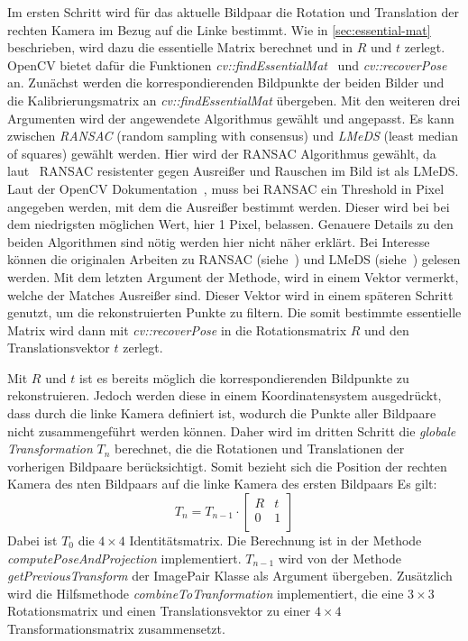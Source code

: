 Im ersten Schritt wird für das aktuelle Bildpaar die Rotation und Translation der rechten Kamera im Bezug auf die Linke bestimmt.
Wie in \cref{sec:essential-mat} beschrieben, wird dazu die essentielle Matrix berechnet und in $R$ und $t$ zerlegt.
OpenCV bietet dafür die Funktionen \emph{cv::findEssentialMat}~\cite{opencv_doc_essential_matrix} und \emph{cv::recoverPose}~\cite{opencv_doc_recover_pose} an.
Zunächst werden die korrespondierenden Bildpunkte der beiden Bilder und die Kalibrierungsmatrix an \emph{cv::findEssentialMat} übergeben.
Mit den weiteren drei Argumenten wird der angewendete Algorithmus gewählt und angepasst.
Es kann zwischen \emph{RANSAC} (random sampling with consensus) und \emph{LMeDS} (least median of squares) gewählt werden.
Hier wird der RANSAC Algorithmus gewählt, da laut~\cite[Kapitel 18, 664]{kaehler_2016} RANSAC resistenter gegen Ausreißer und Rauschen im Bild ist als LMeDS. %
Laut der OpenCV Dokumentation~\cite{opencv_doc_essential_matrix}, muss bei RANSAC ein Threshold in Pixel angegeben werden, mit dem die Ausreißer bestimmt werden.
Dieser wird bei bei dem niedrigsten möglichen Wert, hier 1 Pixel, belassen.
Genauere Details zu den beiden Algorithmen sind nötig werden hier nicht näher erklärt.
Bei Interesse können die originalen Arbeiten zu RANSAC (siehe~\cite{fischler_81}) und LMeDS (siehe~\cite{inui_03}) gelesen werden.
Mit dem letzten Argument der Methode, wird in einem Vektor vermerkt, welche der Matches Ausreißer sind.
Dieser Vektor wird in einem späteren Schritt genutzt, um die rekonstruierten Punkte zu filtern.
Die somit bestimmte essentielle Matrix wird dann mit \emph{cv::recoverPose} in die Rotationsmatrix $R$ und den Translationsvektor $t$ zerlegt.

Mit $R$ und $t$ ist es bereits möglich die korrespondierenden Bildpunkte zu rekonstruieren.
Jedoch werden diese in einem Koordinatensystem ausgedrückt, dass durch die linke Kamera definiert ist, wodurch die Punkte aller Bildpaare nicht zusammengeführt werden können.
Daher wird im dritten Schritt die \emph{globale Transformation} $T_n$ berechnet, die die Rotationen und Translationen der vorherigen Bildpaare berücksichtigt.
Somit bezieht sich die Position der rechten Kamera des nten Bildpaars auf die linke Kamera des ersten Bildpaars 
Es gilt:
\[ T_n = T_{n-1} \cdot \begin{bmatrix}
            R & t \\
            0 & 1 \\
        \end{bmatrix}
    \] 
Dabei ist $T_0$ die $4 \times 4$ Identitätsmatrix.
Die Berechnung ist in der Methode \emph{computePoseAndProjection} implementiert.
$T_{n-1}$ wird von der Methode \emph{getPreviousTransform} der ImagePair Klasse als Argument übergeben. %
Zusätzlich wird die Hilfsmethode \emph{combineToTranformation} implementiert, die eine $3\times3$ Rotationsmatrix und einen Translationsvektor zu einer $4\times4$ Transformationsmatrix zusammensetzt.

